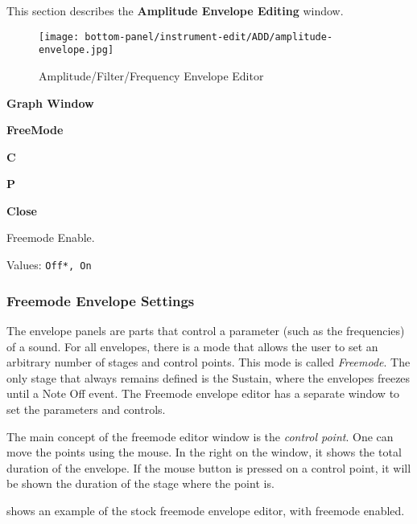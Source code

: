    This section describes the \textbf{Amplitude Envelope Editing} window.

\begin{figure}[H]
   \centering 
   \texttt{[image: bottom-panel/instrument-edit/ADD/amplitude-envelope.jpg]}
   \caption{Amplitude/Filter/Frequency Envelope Editor}
   \label{fig:amplitude_envelope_editor}
\end{figure}

   \begin{enumber}
      \item \textbf{Graph Window}
      \item \textbf{FreeMode}
      \item \textbf{C}
      \item \textbf{P}
      \item \textbf{Close}
   \end{enumber}

   \setcounter{ItemCounter}{0}      %

   Freemode Enable.

   Values: \texttt{Off*, On} \\

\subsubsection{Freemode Envelope Settings}
\label{subsubsec:freemode_envelope_settings}

   The envelope panels are parts that control a parameter (such as the
   frequencies) of a sound.  For all envelopes, there is a mode that allows the
   user to set an arbitrary number of stages and control points. This mode is
   called \textsl{Freemode}.  The only stage that always remains defined is the
   Sustain, where the envelopes freezes until a Note Off event.  The Freemode
   envelope editor has a separate window to set the parameters and controls.

   The main concept of the freemode editor window is the
   \textsl{control point}.
   One can move the points using the mouse. In the right on the
   window, it shows the total duration of the envelope. If the mouse button
   is pressed on a control point, it will be shown the duration of the
   stage where the point is.

   shows an example of the stock freemode envelope editor, with
   freemode enabled.

